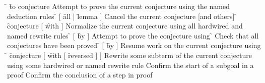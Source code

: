 \begin{description}
\dt \f{}  \f{to conjecture}
\dd Attempt to prove the current conjecture using the named deduction rules
\dt \f{} [ \f{all} | \f{lemma} ]
\dd Cancel the current conjecture [and others]
\dt \f{} \f{conjecture} [ \f{with}  ]
\dd Normalize the current conjecture using all hardwired and named rewrite 
    rules
\dt \f{}  [ \f{by}  ]
\dd Attempt to prove the conjecture using 
\dt \f{}
\dd Check that all conjectures have been proved
\dt \f{} [ \f{by}  ]
\dd Resume work on the current conjecture using 
\dt \f{} \f{conjecture}
     [ \f{with} [ \f{reversed} ]  ]
\dd Rewrite some subterm of the current conjecture
     using some hardwired or named rewrite rule
\dt {}
\dd Confirm the start of a subgoal in a proof
\dt {}
\dd Confirm the conclusion of a step in proof
\end{description}


